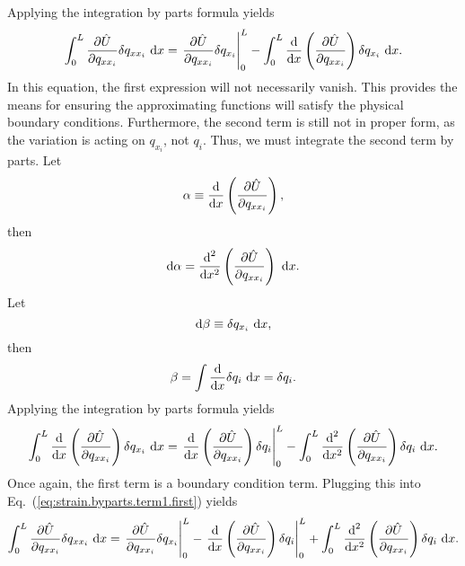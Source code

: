 Applying the integration by parts formula yields
\begin{equation}
\int_0^L\frac{\partial \hat U}{\partial q_{xx_i}}\delta q_{xx_i}\text{ d}x = \left.\frac{\partial \hat U}{\partial q_{xx_i}}\delta q_{x_i}\right|_0^L-\int_0^L\frac{\text d}{\text dx}\left(\frac{\partial \hat{U}}{\partial q_{xx_i}}\right)\delta q_{x_i}\text{ d}x.
\label{eq:strain.byparts.term1.first}
\end{equation}
In this equation, the first expression will not necessarily vanish. This provides the means for ensuring the approximating functions will satisfy the physical boundary conditions. Furthermore, the second term is still not in proper form, as the variation is acting on $q_{x_i}$, not $q_i$. Thus, we must integrate the second term by parts.
Let
\begin{equation}
\alpha \equiv \frac{\text d}{\text dx}\left(\frac{\partial \hat{U}}{\partial q_{xx_i}}\right),
\end{equation}
then
\begin{equation}
\text d\alpha = \frac{\text d^2}{\text dx^2}\left(\frac{\partial \hat{U}}{\partial q_{xx_i}}\right)\text{ d}x.
\end{equation}
Let
\begin{equation}
\text d\beta \equiv \delta q_{x_i}\text{ d}x,
\end{equation}
then
\begin{equation}
\beta = \int \frac{\text d}{\text dx}\delta q_i \text{ d}x = \delta q_i.
\end{equation}
Applying the integration by parts formula yields
\begin{equation}
\int_0^L\frac{\text d}{\text dx}\left(\frac{\partial \hat{U}}{\partial q_{xx_i}}\right)\delta q_{x_i}\text{ d}x = \left.\frac{\text d}{\text dx}\left(\frac{\partial \hat{U}}{\partial q_{xx_i}}\right)\delta q_i\right|_0^L - \int_0^L \frac{\text d^2}{\text dx^2}\left(\frac{\partial \hat{U}}{\partial q_{xx_i}}\right)\delta q_i\text{ d}x.
\end{equation}
Once again, the first term is a boundary condition term.
Plugging this into Eq.~(\ref{eq:strain.byparts.term1.first}) yields
\begin{equation}
\int_0^L\frac{\partial \hat U}{\partial q_{xx_i}}\delta q_{xx_i}\text{ d}x = \left.\frac{\partial \hat U}{\partial q_{xx_i}}\delta q_{x_i}\right|_0^L-\left.\frac{\text d}{\text dx}\left(\frac{\partial \hat{U}}{\partial q_{xx_i}}\right)\delta q_i\right|_0^L+\int_0^L \frac{\text d^2}{\text dx^2}\left(\frac{\partial \hat{U}}{\partial q_{xx_i}}\right)\delta q_i\text{ d}x.
\label{eq:strain.byparts.term1}
\end{equation}
